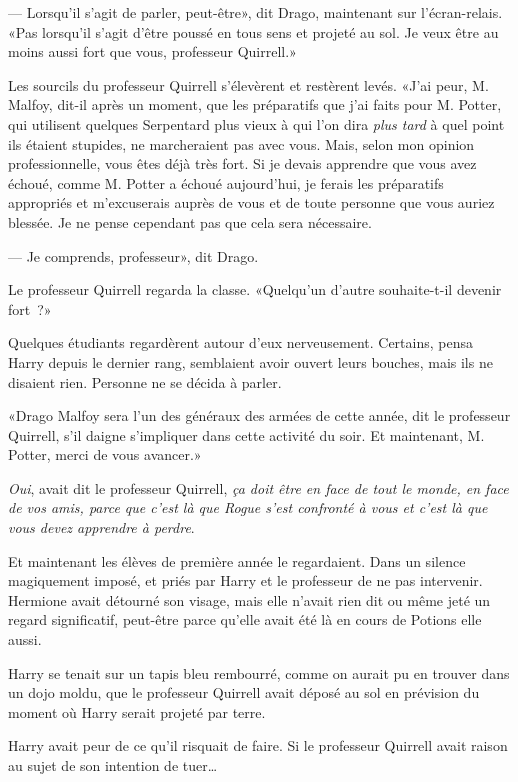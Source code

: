 --- Lorsqu'il s'agit de parler, peut-être», dit Drago, maintenant sur l'écran-relais. «Pas lorsqu'il s'agit d'être poussé en tous sens et projeté au sol. Je veux être au moins aussi fort que vous, professeur Quirrell.»

Les sourcils du professeur Quirrell s'élevèrent et restèrent levés. «J'ai peur, M. Malfoy, dit-il après un moment, que les préparatifs que j'ai faits pour M. Potter, qui utilisent quelques Serpentard plus vieux à qui l'on dira \emph{plus tard} à quel point ils étaient stupides, ne marcheraient pas avec vous. Mais, selon mon opinion professionnelle, vous êtes déjà très fort. Si je devais apprendre que vous avez échoué, comme M. Potter a échoué aujourd'hui, je ferais les préparatifs appropriés et m'excuserais auprès de vous et de toute personne que vous auriez blessée. Je ne pense cependant pas que cela sera nécessaire.

--- Je comprends, professeur», dit Drago.

Le professeur Quirrell regarda la classe. «Quelqu'un d'autre souhaite-t-il devenir fort~?»

Quelques étudiants regardèrent autour d'eux nerveusement. Certains, pensa Harry depuis le dernier rang, semblaient avoir ouvert leurs bouches, mais ils ne disaient rien. Personne ne se décida à parler.

«Drago Malfoy sera l'un des généraux des armées de cette année, dit le professeur Quirrell, s'il daigne s'impliquer dans cette activité du soir. Et maintenant, M. Potter, merci de vous avancer.»

\later

\emph{Oui}, avait dit le professeur Quirrell, \emph{ça doit être en face de tout le monde, en face de vos amis, parce que c'est là que Rogue s'est confronté à vous et c'est là que vous devez apprendre à perdre}.

Et maintenant les élèves de première année le regardaient. Dans un silence magiquement imposé, et priés par Harry et le professeur de ne pas intervenir. Hermione avait détourné son visage, mais elle n'avait rien dit ou même jeté un regard significatif, peut-être parce qu'elle avait été là en cours de Potions elle aussi.

Harry se tenait sur un tapis bleu rembourré, comme on aurait pu en trouver dans un dojo moldu, que le professeur Quirrell avait déposé au sol en prévision du moment où Harry serait projeté par terre.

Harry avait peur de ce qu'il risquait de faire. Si le professeur Quirrell avait raison au sujet de son intention de tuer…

